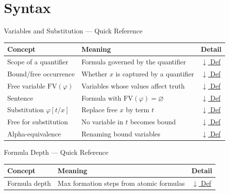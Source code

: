 \section{Syntax}




\begin{toolkitbox}{Variables and Substitution --- Quick Reference}
\small
\begin{tabular}{l l l}
\toprule
\textbf{Concept} & \textbf{Meaning} & \textbf{Detail} \\
\midrule
Scope of a quantifier  & Formula governed by the quantifier  & \hyperref[def:scope]{$\downarrow$ Def} \\
Bound/free occurrence  & Whether $x$ is captured by a quantifier & \hyperref[def:bound-free]{$\downarrow$ Def} \\
Free variable $\mathrm{FV}(\varphi)$ & Variables whose values affect truth & \hyperref[def:fv]{$\downarrow$ Def} \\
Sentence               & Formula with $\mathrm{FV}(\varphi)=\varnothing$ & \hyperref[def:sentence]{$\downarrow$ Def} \\
Substitution $\varphi[t/x]$ & Replace free $x$ by term $t$      & \hyperref[def:subst-notation]{$\downarrow$ Def} \\
Free for substitution  & No variable in $t$ becomes bound    & \hyperref[def:free-for]{$\downarrow$ Def} \\
Alpha-equivalence      & Renaming bound variables             & \hyperref[def:alpha-equiv]{$\downarrow$ Def} \\
\bottomrule
\end{tabular}
\end{toolkitbox}



\begin{toolkitbox}{Formula Depth --- Quick Reference}
\small
\begin{tabular}{l l l}
\toprule
\textbf{Concept} & \textbf{Meaning} & \textbf{Detail} \\
\midrule
Formula depth & Max formation steps from atomic formulas & \hyperref[def:formula-depth]{$\downarrow$ Def} \\
\bottomrule
\end{tabular}
\end{toolkitbox}


